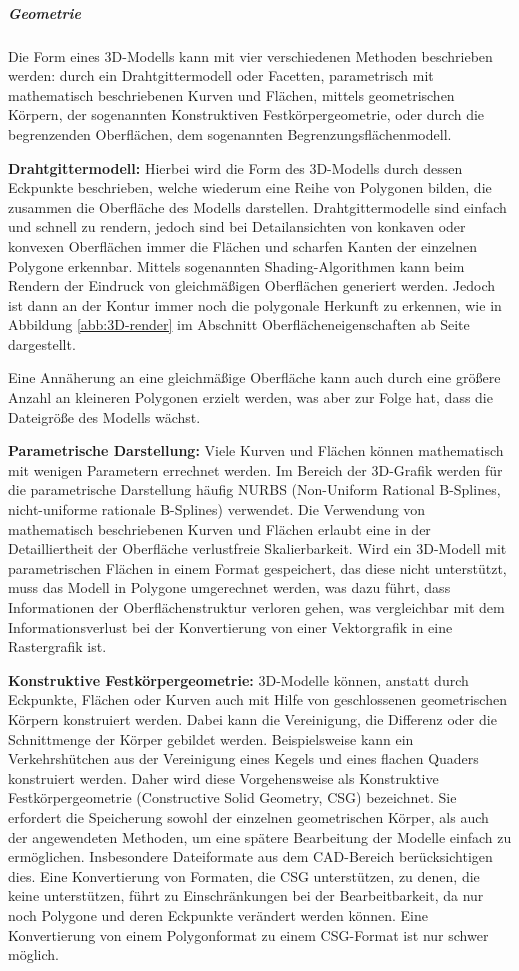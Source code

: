 \subparagraph{Geometrie} Die Form eines 3D-Modells kann mit vier verschiedenen Methoden beschrieben werden: durch ein Drahtgittermodell oder Facetten, parametrisch mit mathematisch beschriebenen Kurven und Flächen, mittels geometrischen Körpern, der sogenannten Konstruktiven Festkörpergeometrie, oder durch die begrenzenden Oberflächen, dem sogenannten Begrenzungsflächenmodell.

{\bfseries Drahtgittermodell:} Hierbei wird die Form des 3D-Modells durch dessen Eckpunkte beschrieben, welche wiederum eine Reihe von Polygonen bilden, die zusammen die Oberfläche des Modells darstellen. Drahtgittermodelle sind einfach und schnell zu rendern, jedoch sind bei Detailansichten von konkaven oder konvexen Oberflächen immer die Flächen und scharfen Kanten der einzelnen Polygone erkennbar. Mittels sogenannten Shading-Algorithmen kann beim Rendern der Eindruck von gleichmäßigen Oberflächen generiert werden. Jedoch ist dann an der Kontur immer noch die polygonale Herkunft zu erkennen, wie in Abbildung \ref{abb:3D-render} im Abschnitt Oberflächeneigenschaften ab Seite \pageref{3d_aussehen} dargestellt.  

Eine Annäherung an eine gleichmäßige Oberfläche kann auch durch eine größere Anzahl an kleineren Polygonen erzielt werden, was aber zur Folge hat, dass die Dateigröße des Modells wächst. 

{\bfseries Parametrische Darstellung:} Viele Kurven und Flächen können mathematisch mit wenigen Parametern errechnet werden. Im Bereich der 3D-Grafik werden für die parametrische Darstellung häufig NURBS (Non-Uniform Rational B-Splines, nicht-uniforme rationale B-Splines) verwendet. Die Verwendung von mathematisch beschriebenen Kurven und Flächen erlaubt eine in der Detailliertheit der Oberfläche verlustfreie Skalierbarkeit. Wird ein 3D-Modell mit parametrischen Flächen in einem Format gespeichert, das diese nicht unterstützt, muss das Modell in Polygone umgerechnet werden, was dazu führt, dass Informationen der Oberflächenstruktur verloren gehen, was vergleichbar mit dem Informationsverlust bei der Konvertierung von einer Vektorgrafik in eine Rastergrafik ist.

{\bfseries Konstruktive Festkörpergeometrie:} 3D-Modelle können, anstatt durch Eckpunkte, Flächen oder Kurven auch mit Hilfe von geschlossenen geometrischen Körpern konstruiert werden. Dabei kann die Vereinigung, die Differenz oder die Schnittmenge der Körper gebildet werden. Beispielsweise kann ein Verkehrshütchen aus der Vereinigung eines Kegels und eines flachen Quaders konstruiert werden. Daher wird diese Vorgehensweise als Konstruktive Festkörpergeometrie (Constructive Solid Geometry, CSG) bezeichnet. Sie erfordert die Speicherung sowohl der einzelnen geometrischen Körper, als auch der angewendeten Methoden, um eine spätere Bearbeitung der Modelle einfach zu ermöglichen. Insbesondere Dateiformate aus dem CAD-Bereich berücksichtigen dies. Eine Konvertierung von Formaten, die CSG unterstützen, zu denen, die keine unterstützen, führt zu Einschränkungen bei der Bearbeitbarkeit, da nur noch Polygone und deren Eckpunkte verändert werden können. Eine Konvertierung von einem Polygonformat zu einem CSG-Format ist nur schwer möglich. 

